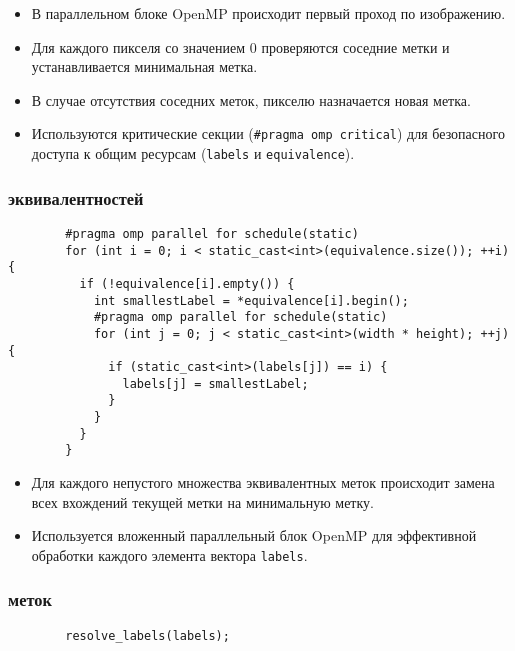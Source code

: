 \documentclass[a4paper, 14pt]{article}
\begin{document}
        \begin{itemize}
          \item В параллельном блоке OpenMP происходит первый проход по изображению.
          \item Для каждого пикселя со значением 0 проверяются соседние метки и устанавливается минимальная метка.
          \item В случае отсутствия соседних меток, пикселю назначается новая метка.
          \item Используются критические секции (\texttt{\#pragma omp critical}) для безопасного доступа к общим ресурсам (\texttt{labels} и \texttt{equivalence}).
        \end{itemize}
        
        \subsubsection*{ эквивалентностей}
        
        \begin{verbatim}
        #pragma omp parallel for schedule(static)
        for (int i = 0; i < static_cast<int>(equivalence.size()); ++i) {
          if (!equivalence[i].empty()) {
            int smallestLabel = *equivalence[i].begin();
            #pragma omp parallel for schedule(static)
            for (int j = 0; j < static_cast<int>(width * height); ++j) {
              if (static_cast<int>(labels[j]) == i) {
                labels[j] = smallestLabel;
              }
            }
          }
        }
        \end{verbatim}
        
        \begin{itemize}
          \item Для каждого непустого множества эквивалентных меток происходит замена всех вхождений текущей метки на минимальную метку.
          \item Используется вложенный параллельный блок OpenMP для эффективной обработки каждого элемента вектора \texttt{labels}.
        \end{itemize}
        
        \subsubsection*{ меток}
        
        \begin{verbatim}
        resolve_labels(labels);
        \end{verbatim}
        
\end{document}

